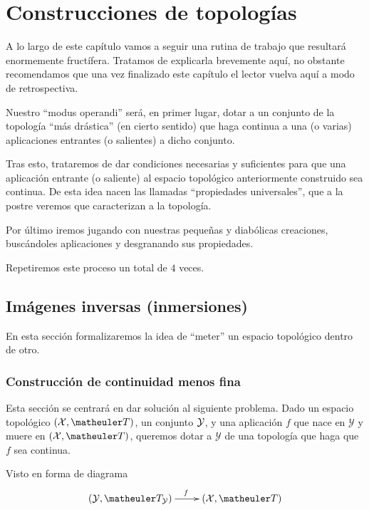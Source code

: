 \chapter{Construcciones de topologías}
\label{const}
A lo largo de este capítulo vamos a seguir una rutina de trabajo que resultará enormemente fructífera. Tratamos de explicarla brevemente aquí, no obstante recomendamos que una vez finalizado este capítulo el lector vuelva aquí a modo de retrospectiva.

Nuestro ``modus operandi'' será, en primer lugar, dotar a un conjunto de la topología ``más drástica'' (en cierto sentido) que haga continua a una (o varias) aplicaciones entrantes (o salientes) a dicho conjunto.

Tras esto, trataremos de dar condiciones necesarias y suficientes para que una aplicación entrante (o saliente) al espacio topológico anteriormente construido sea continua. De esta idea nacen las llamadas ``propiedades universales'', que a la postre veremos que caracterizan a la topología.

Por último iremos jugando con nuestras pequeñas y diabólicas creaciones, buscándoles aplicaciones y desgranando sus propiedades.

Repetiremos este proceso un total de $4$ veces. 
\section{Imágenes inversas (inmersiones)}
En esta sección formalizaremos la idea de ``meter'' un espacio topológico dentro de otro.
\subsection{Construcción de continuidad menos fina}
Esta sección se centrará en dar solución al siguiente problema. Dado un espacio topológico $(\mathcal{X},\T)$, un conjunto $\mathcal{Y}$, y una aplicación $f$ que nace en $\mathcal{Y}$ y muere en $(\mathcal{X},\T)$, queremos dotar a $\mathcal{Y}$ de una topología que haga que $f$ sea continua.

Visto en forma de diagrama
\begin{equation*}
\xymatrix{
	(\mc{Y},\T_\Y) \ar[r]^f
	&(\mathcal{X},\T)}
\end{equation*}

